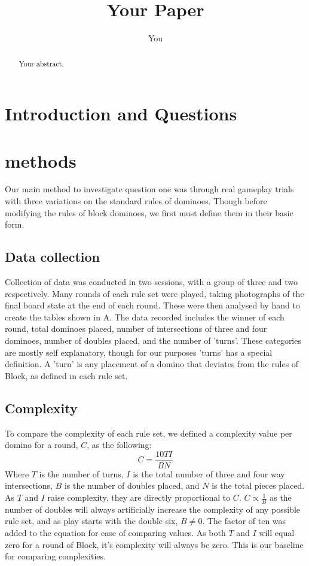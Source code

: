 \documentclass{article}
\title{Your Paper}
\author{You}
\begin{document}
\maketitle

\begin{abstract}
Your abstract.
\end{abstract}

\section{Introduction and Questions}
\section{methods}
Our main method to investigate question one was through real gameplay trials with three variations on the standard rules of dominoes. Though before modifying the rules of block dominoes, we first must define them in their basic form. %
\subsection{Data collection}
Collection of data was conducted in two sessions, with a group of three and two respectively. Many rounds of each rule set were played, taking photographs of the final board state at the end of each round. These were then analysed by hand to create the tables shown in A. The data recorded includes the winner of each round, total dominoes placed, number of intersections of three and four dominoes, number of doubles placed, and the number of 'turns'. These categories are mostly self explanatory, though for our purposes 'turns' has a special definition. A 'turn' is any placement of a domino that deviates from the rules of Block, as defined in each rule set.
\subsection{Complexity}
To compare the complexity of each rule set, we defined a complexity value per domino for a round, \(C\), as the following:
\begin{equation}\label{Eqn1}
    C=\frac{10TI}{BN}
\end{equation}
Where \(T\) is the number of turns, \(I\) is the total number of three and four way intersections, \(B\) is the number of doubles placed, and \(N\) is the total pieces placed. As \(T\) and \(I\) raise complexity, they are directly proportional to \(C\). \(C\propto\frac{1}{B}\) as the number of doubles will always artificially increase the complexity of any possible rule set, and as play starts with the double six, \(B\neq0\). The factor of ten was added to the equation for ease of comparing values. As both \(T\) and \(I\) will equal zero for a round of Block, it's complexity will always be zero. This is our baseline for comparing complexities. 
\end{document}
